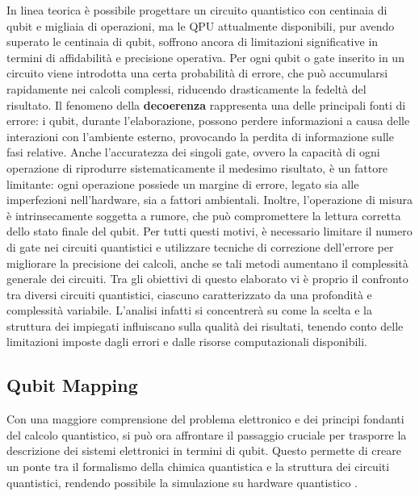 In linea teorica è possibile progettare un circuito quantistico con centinaia di qubit e migliaia di operazioni, ma le QPU attualmente disponibili, pur avendo superato le centinaia di qubit, soffrono ancora di limitazioni significative in termini di affidabilità e precisione operativa. Per ogni qubit o gate inserito in un circuito viene introdotta una certa probabilità di errore, che può accumularsi rapidamente nei calcoli complessi, riducendo drasticamente la fedeltà del risultato. Il fenomeno della \textbf{decoerenza} rappresenta una delle principali fonti di errore: i qubit, durante l’elaborazione, possono perdere informazioni a causa delle interazioni con l’ambiente esterno, provocando la perdita di informazione sulle fasi relative. Anche l'accuratezza dei singoli gate, ovvero la capacità di ogni operazione di riprodurre sistematicamente il medesimo risultato, è un fattore limitante: ogni operazione possiede un margine di errore, legato sia alle imperfezioni nell’hardware, sia a fattori ambientali. Inoltre, l’operazione di misura è intrinsecamente soggetta a rumore, che può compromettere la lettura corretta dello stato finale del qubit. Per tutti questi motivi, è necessario limitare il numero di gate nei circuiti quantistici e utilizzare tecniche di correzione dell’errore per migliorare la precisione dei calcoli, anche se tali metodi aumentano il complessità generale dei circuiti. 
Tra gli obiettivi di questo elaborato vi è proprio il confronto tra diversi circuiti quantistici, ciascuno caratterizzato da una profondità e complessità variabile. L’analisi infatti si concentrerà su come la scelta e la struttura dei  impiegati influiscano sulla qualità dei risultati, tenendo conto delle limitazioni imposte dagli errori e dalle risorse computazionali disponibili.


\subsection{Qubit Mapping}\label{subsec:qubit-mapping}

Con una maggiore comprensione del problema elettronico e dei principi fondanti del calcolo quantistico, si può ora affrontare il passaggio cruciale per trasporre la descrizione dei sistemi elettronici in termini di qubit. Questo permette di creare un ponte tra il formalismo della chimica quantistica e la struttura dei circuiti quantistici, rendendo possibile la simulazione su hardware quantistico \cite{Anand_2022,McArdle_2020}.

